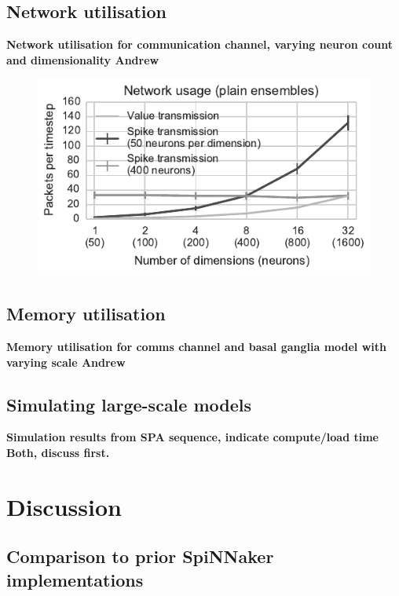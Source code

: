 \documentclass[conference]{IEEEtran}
\begin{document}
  \subsection{Network utilisation}

  \textbf{Network utilisation for communication channel, varying neuron count and dimensionality \color{red} Andrew}

  \begin{figure}[!t]
    \includegraphics{figures/network-1}
    \caption{}
    \label{fig:results/network-utilisation}
  \end{figure}

  \subsection{Memory utilisation}

  \textbf{Memory utilisation for comms channel and basal ganglia model with varying scale \color{red} Andrew}

  \subsection{Simulating large-scale models}
  \label{sec:spa-sequence}

  \textbf{Simulation results from SPA sequence, indicate compute/load time \color{red} Both, discuss first.}

  \section{Discussion}

  \subsection{Comparison to prior SpiNNaker implementations}
\end{document}
